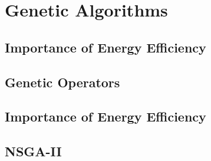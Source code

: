 %
%
%
\chapter{Genetic Algorithms}\label{ch:ga}
\section{Importance of Energy Efficiency} \label{sec:motivation}
\section{Genetic Operators} \label{sec:operators}
\section{Importance of Energy Efficiency} \label{sec:moga}
\section{NSGA-II} \label{sec:nsga}